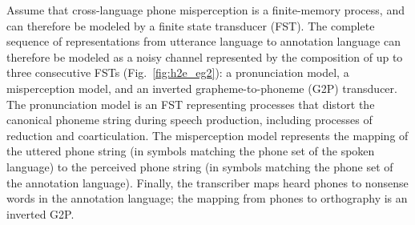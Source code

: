 Assume that cross-language phone misperception is a finite-memory
process, and can therefore be modeled by a finite state transducer
(FST).  The complete sequence of representations from utterance
language to annotation language can therefore be modeled as a noisy
channel represented by the composition of up to three consecutive FSTs
(Fig.~\ref{fig:h2e_eg2}): a pronunciation model, a misperception
model, and an inverted grapheme-to-phoneme (G2P) transducer.  The
pronunciation model is an FST representing processes that distort the
canonical phoneme string during speech production, including processes
of reduction and coarticulation.  The misperception model represents
the mapping of the uttered phone string (in symbols matching the
phone set of the spoken language) to the perceived phone string (in
symbols matching the phone set of the annotation language).  Finally,
the transcriber maps heard phones to nonsense words in the annotation
language; the mapping from phones to orthography is an inverted G2P.

